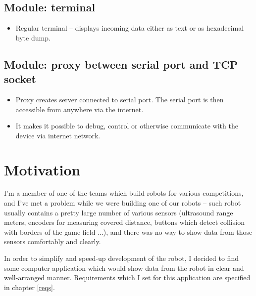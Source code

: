 \documentclass[12pt, a4paper, oneside]{article}
\begin{document}
\subsection*{Module: terminal}
\begin{itemize}
    \item Regular terminal -- displays incoming data either as text or as hexadecimal byte dump.
\end{itemize}

\subsection*{Module: proxy between serial port and TCP socket}
\begin{itemize}
    \item Proxy creates server connected to serial port. The serial port is then accessible from anywhere via the internet.
    \item It makes it possible to debug, control or otherwise communicate with the device via internet network.
\end{itemize}

\section{Motivation}
\label{motivace}
I'm a member of one of the teams which build robots for various competitions, and I've met a problem while we were building one of our robots -- such robot usually contains a pretty large number of various sensors (ultrasound range meters, encoders for measuring covered distance, buttons which detect collision with borders of the game field ...), and there was no way to show data from those sensors comfortably and clearly.

In order to simplify and speed-up development of the robot, I decided to find some computer application which would show data from the robot in clear and well-arranged manner. Requirements which I set for this application are specified in chapter \ref{reqs}.
\end{document}

